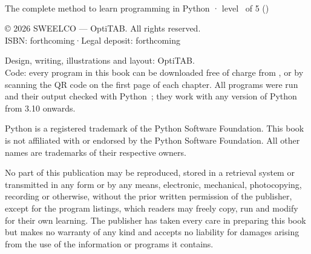 \thispagestyle{empty}
\vspace*{\fill}
{\fontsize{8.6}{11.6}\selectfont\color{otMuted}
\\
The complete method to learn programming in Python · level \otNiveau\ of 5 (\MakeLowercase{\otNiveauNom})\par\vspace{3mm}
\noindent© 2026 SWEELCO — OptiTAB. All rights reserved.\\
ISBN: forthcoming\quad·\quad Legal deposit: forthcoming\par\vspace{3mm}
\noindent Design, writing, illustrations and layout: OptiTAB.\\
Code: every program in this book can be downloaded free of charge from \otCodeAffiche, or by
scanning the QR code on the first page of each chapter. All programs were run and their output
checked with Python~\otVersionPython; they work with any version of Python from 3.10 onwards.\par\vspace{3mm}
\noindent Python is a registered trademark of the Python Software Foundation. This book is not
affiliated with or endorsed by the Python Software Foundation. All other names are trademarks
of their respective owners.\par\vspace{3mm}
\noindent No part of this publication may be reproduced, stored in a retrieval system or transmitted
in any form or by any means, electronic, mechanical, photocopying, recording or otherwise,
without the prior written permission of the publisher, except for the program listings, which
readers may freely copy, run and modify for their own learning. The publisher has taken every
care in preparing this book but makes no warranty of any kind and accepts no liability for
damages arising from the use of the information or programs it contains.\par}
\clearpage
